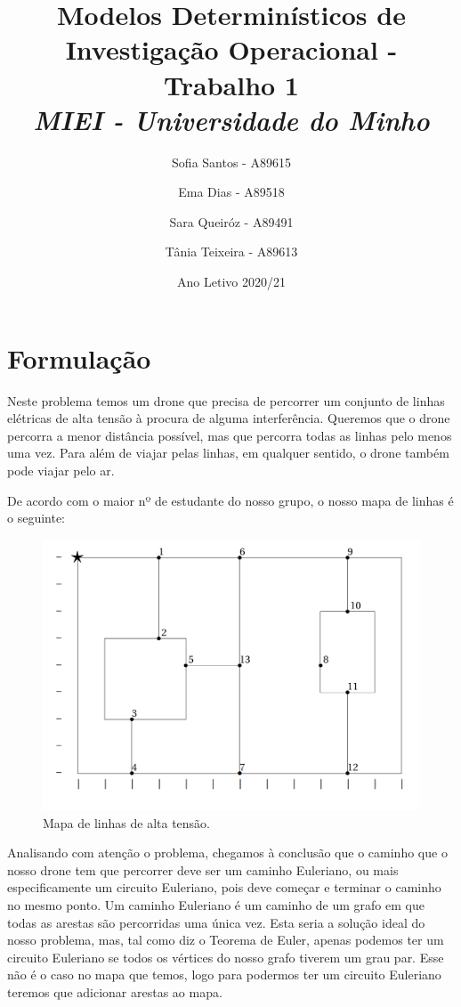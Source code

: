 \documentclass{article}
\begin{document}
\title{Modelos Determinísticos de Investigação Operacional - Trabalho 1\\
    \large\emph{MIEI - Universidade do Minho}}
\author{Sofia Santos - A89615 \and Ema Dias - A89518 \and
    Sara Queiróz - A89491 \and Tânia Teixeira - A89613}

\date{Ano Letivo 2020/21}    

\maketitle

\newpage

\section{Formulação}

Neste problema temos um drone que precisa de percorrer um conjunto de linhas elétricas de alta tensão à procura de alguma interferência. Queremos que o drone percorra a menor distância possível, mas que percorra todas as linhas pelo menos uma vez. Para além de viajar pelas linhas, em qualquer sentido, o drone também pode viajar pelo ar.

De acordo com o maior nº de estudante do nosso grupo, o nosso mapa de linhas é o seguinte:

\begin{figure}[h]
    \includegraphics[width=\linewidth]{fig1.png}
    \caption{Mapa de linhas de alta tensão.}
    \label{mapa}
\end{figure}

Analisando com atenção o problema, chegamos à conclusão que o caminho que o nosso drone tem que percorrer deve ser um caminho Euleriano, ou mais especificamente um circuito Euleriano, pois deve começar e terminar o caminho no mesmo ponto. Um caminho Euleriano é um caminho de um grafo em que todas as arestas são percorridas uma única vez. Esta seria a solução ideal do nosso problema, mas, tal como diz o Teorema de Euler, apenas podemos ter um circuito Euleriano se todos os vértices do nosso grafo tiverem um grau par. Esse não é o caso no mapa que temos, logo para podermos ter um circuito Euleriano teremos que adicionar arestas ao mapa.
\end{document}
